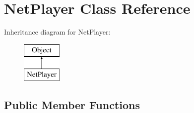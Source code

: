 \hypertarget{class_net_player}{}\section{Net\+Player Class Reference}
\label{class_net_player}
Inheritance diagram for Net\+Player\+:\begin{figure}[H]
\begin{center}
\leavevmode
\includegraphics[height=2.000000cm]{class_net_player}
\end{center}
\end{figure}
\subsection*{Public Member Functions}
